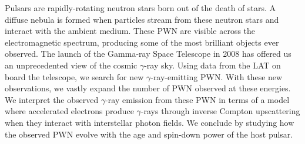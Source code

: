 
Pulsars are rapidly-rotating neutron stars born out of the death of
stars.  A diffuse nebula is formed when particles stream from these
neutron stars and interact with the ambient medium. These \ac{PWN}
are visible across the electromagnetic spectrum,  producing some of the
most brilliant objects ever observed.  The launch of the \fermi Gamma-ray
Space Telescope in 2008 has offered us an unprecedented view of the cosmic
$\gamma$-ray sky.  Using data from the \acrlong{LAT} on board the \fermi
telescope, we search for new $\gamma$-ray-emitting \ac{PWN}.  With these
new observations, we vastly expand the number of \ac{PWN} observed
at these energies. We interpret the observed $\gamma$-ray emission
from these \ac{PWN} in terms of a model where accelerated electrons
produce $\gamma$-rays through inverse Compton upscattering when they
interact with interstellar photon fields.  We conclude by studying how
the observed \ac{PWN} evolve with the age and spin-down power
of the host pulsar.
